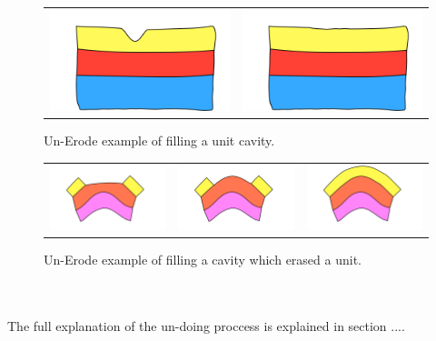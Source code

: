 \documentclass[12pt, a4paper]{report} %
\begin{document}
\begin{figure}[htb]
\centering
\begin{tabular}{@{}cc@{}}
\includegraphics[width=.35\textwidth]{unErodeUpDescription0.png}&
\includegraphics[width=.35\textwidth]{unErodeUpDescription1.png}\\
\end{tabular}
\caption{Un-Erode example of filling a unit cavity.}
\label{unerodeeg}
\end{figure}

\begin{figure}[htb]
\centering
\begin{tabular}{@{}ccc@{}}
\includegraphics[width=.35\textwidth]{unErodeConvexDescription0.png}&
\includegraphics[width=.35\textwidth]{unErodeConvexDescription1.png}&
\includegraphics[width=.35\textwidth]{unErodeConvexDescription2.png}\\
\end{tabular}
\caption{Un-Erode example of filling a cavity which erased a unit.}
\label{unerodecveg}
\end{figure}\\\\
The full explanation of the un-doing proccess is explained in section ....
\end{document}
